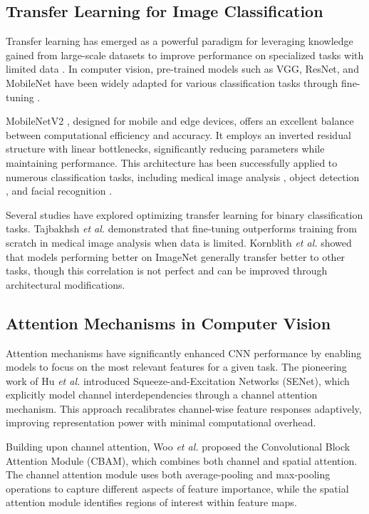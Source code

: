 \documentclass{article}
\begin{document}
\subsection{Transfer Learning for Image Classification}

Transfer learning has emerged as a powerful paradigm for leveraging knowledge gained from large-scale datasets to improve performance on specialized tasks with limited data \cite{pan2010survey}. In computer vision, pre-trained models such as VGG, ResNet, and MobileNet have been widely adapted for various classification tasks through fine-tuning \cite{zhuang2020comprehensive}.

MobileNetV2 \cite{sandler2018mobilenetv2}, designed for mobile and edge devices, offers an excellent balance between computational efficiency and accuracy. It employs an inverted residual structure with linear bottlenecks, significantly reducing parameters while maintaining performance. This architecture has been successfully applied to numerous classification tasks, including medical image analysis \cite{khan2019deep}, object detection \cite{howard2019searching}, and facial recognition \cite{deng2019arcface}.

Several studies have explored optimizing transfer learning for binary classification tasks. Tajbakhsh \textit{et al.} \cite{tajbakhsh2016convolutional} demonstrated that fine-tuning outperforms training from scratch in medical image analysis when data is limited. Kornblith \textit{et al.} \cite{kornblith2019better} showed that models performing better on ImageNet generally transfer better to other tasks, though this correlation is not perfect and can be improved through architectural modifications.

\subsection{Attention Mechanisms in Computer Vision}

Attention mechanisms have significantly enhanced CNN performance by enabling models to focus on the most relevant features for a given task. The pioneering work of Hu \textit{et al.} \cite{hu2018squeeze} introduced Squeeze-and-Excitation Networks (SENet), which explicitly model channel interdependencies through a channel attention mechanism. This approach recalibrates channel-wise feature responses adaptively, improving representation power with minimal computational overhead.

Building upon channel attention, Woo \textit{et al.} \cite{woo2018cbam} proposed the Convolutional Block Attention Module (CBAM), which combines both channel and spatial attention. The channel attention module uses both average-pooling and max-pooling operations to capture different aspects of feature importance, while the spatial attention module identifies regions of interest within feature maps.
\end{document}
